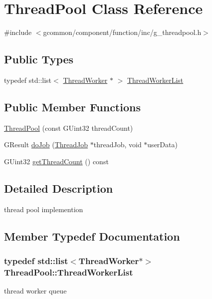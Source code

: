 \hypertarget{class_thread_pool}{\section{Thread\-Pool Class Reference}
\label{class_thread_pool}
}


{\ttfamily \#include $<$gcommon/component/function/inc/g\-\_\-threadpool.\-h$>$}

\subsection*{Public Types}
\begin{DoxyCompactItemize}
\item 
typedef std\-::list$<$ \hyperlink{class_thread_worker}{Thread\-Worker} $\ast$ $>$ \hyperlink{class_thread_pool_a8b34f96bdcec943797a3950d264bec5d}{Thread\-Worker\-List}
\end{DoxyCompactItemize}
\subsection*{Public Member Functions}
\begin{DoxyCompactItemize}
\item 
\hyperlink{class_thread_pool_ac8b77b23f0507fb9c8ebc368677c9c5f}{Thread\-Pool} (const G\-Uint32 thread\-Count)
\item 
G\-Result \hyperlink{class_thread_pool_a5d4848719841e5866347e09863fea56c}{do\-Job} (\hyperlink{class_thread_job}{Thread\-Job} $\ast$thread\-Job, void $\ast$user\-Data)
\item 
G\-Uint32 \hyperlink{class_thread_pool_a49e032cf5a019c6e7b82fdf842c0ad5b}{get\-Thread\-Count} () const 
\end{DoxyCompactItemize}


\subsection{Detailed Description}
thread pool implemention 

\subsection{Member Typedef Documentation}
\hypertarget{class_thread_pool_a8b34f96bdcec943797a3950d264bec5d}{
\subsubsection[{Thread\-Worker\-List}]{\setlength{\rightskip}{0pt plus 5cm}typedef std\-::list$<${\bf Thread\-Worker}$\ast$$>$ {\bf Thread\-Pool\-::\-Thread\-Worker\-List}}}\label{class_thread_pool_a8b34f96bdcec943797a3950d264bec5d}
thread worker queue 

